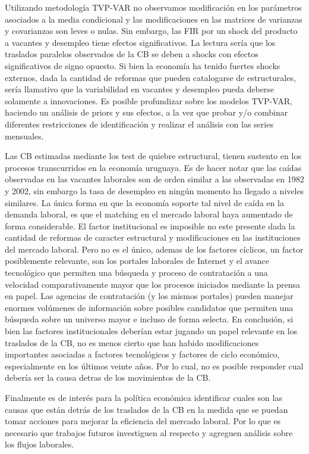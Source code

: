 \documentclass[12pt,oneside]{reedthesis}
\begin{document}
Utilizando metodología TVP-VAR no observamos modificación en los parámetros asociados a la media condicional y las modificaciones en las matrices de varianzas y covarianzas son leves o nulas. Sin embargo, las FIR por un shock del producto a vacantes y desempleo tiene efectos significativos. La lectura sería que los traslados paralelos observados de la CB se deben a shocks con efectos significativos de signo opuesto. Si bien la economía ha tenido fuertes shocks externos, dada la cantidad de reformas que pueden catalogarse de estructurales, sería llamativo que la variabilidad en vacantes y desempleo pueda deberse solamente a innovaciones. Es posible profundizar sobre los modelos TVP-VAR, haciendo un análisis de priors y sus efectos, a la vez que probar y/o combinar diferentes restricciones de identificación y realizar el análisis con las series mensuales.

Las CB estimadas mediante los test de quiebre estructural, tienen sustento en los procesos transcurridos en la economía uruguaya. Es de hacer notar que las caídas observadas en las vacantes laborales son de orden similar a las observadas en 1982 y 2002, sin embargo la tasa de desempleo en ningún momento ha llegado a niveles similares. La única forma en que la economía soporte tal nivel de caída en la demanda laboral, es que el matching en el mercado laboral haya aumentado de forma considerable. El factor institucional es imposible no este presente dada la cantidad de reformas de caracter estructural y modificaciones en las instituciones del mercado laboral. Pero no es el único, ademas de los factores cíclicos, un factor posiblemente relevante, son los portales laborales de Internet y el avance tecnológico que permiten una búsqueda y proceso de contratación a una velocidad comparativamente mayor que los procesos iniciados mediante la prensa en papel. Las agencias de contratación (y los mismos portales) pueden manejar enormes volúmenes de información sobre posibles candidatos que permiten una búsqueda sobre un universo mayor e incluso de forma selecta. En conclusión, si bien las factores institucionales deberían estar jugando un papel relevante en los traslados de la CB, no es menos cierto que han habido modificaciones importantes asociadas a factores tecnológicos y factores de ciclo económico, especialmente en los últimos veinte años. Por lo cual, no es posible responder cual debería ser la causa detras de los movimientos de la CB.

Finalmente es de interés para la política económica identificar cuales son las causas que están detrás de los traslados de la CB en la medida que se puedan tomar acciones para mejorar la eficiencia del mercado laboral. Por lo que es necesario que trabajos futuros investiguen al respecto y agreguen análisis sobre los flujos laborales.
\end{document}
